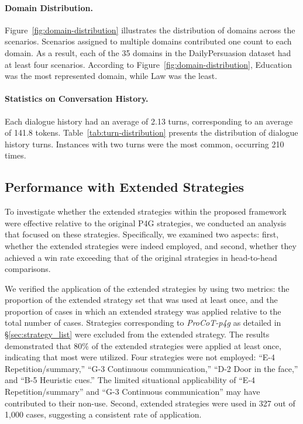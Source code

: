 \documentclass[11pt]{article}
\begin{document}
\paragraph{Domain Distribution.}
Figure~\ref{fig:domain-distribution} illustrates the distribution of domains across the scenarios.  
Scenarios assigned to multiple domains contributed one count to each domain.
As a result, each of the 35 domains in the DailyPersuasion dataset had at least four scenarios.
According to Figure~\ref{fig:domain-distribution}, Education was the most represented domain, while Law was the least.

\paragraph{Statistics on Conversation History.}

Each dialogue history had an average of 2.13 turns, corresponding to an average of 141.8 tokens. 
Table~\ref{tab:turn-distribution} presents the distribution of dialogue history turns. 
Instances with two turns were the most common, occurring 210 times.

\subsection{Performance with Extended Strategies}
To investigate whether the extended strategies within the proposed framework were effective relative to the original P4G strategies, we conducted an analysis that focused on these strategies. 
Specifically, we examined two aspects: first, whether the extended strategies were indeed employed, and second, whether they achieved a win rate exceeding that of the original strategies in head-to-head comparisons.

We verified the application of the extended strategies by using two metrics: the proportion of the extended strategy set that was used at least once, and the proportion of cases in which an extended strategy was applied relative to the total number of cases. 
Strategies corresponding to \textit{ProCoT-p4g} as detailed in \S\ref{sec:strategy_list} were excluded from the extended strategy. 
The results demonstrated that 80\% of the extended strategies were applied at least once, indicating that most were utilized. 
Four strategies were not employed: ``E-4 Repetition/summary,'' ``G-3 Continuous communication,'' ``D-2 Door in the face,'' and ``B-5 Heuristic cues.'' 
The limited situational applicability of ``E-4 Repetition/summary'' and ``G-3 Continuous communication'' may have contributed to their non-use.
Second, extended strategies were used in 327 out of 1,000 cases, suggesting a consistent rate of application.
\end{document}
